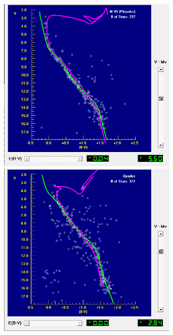 \documentclass[12pt]{article}
\begin{document}
\begin{figure}[H]
    \includegraphics[width= 3.40in]{M45.png}
    \includegraphics[width= 3.40in]{hyades.png}
  \label{hrmetal}
\end{figure}
\end{document}
